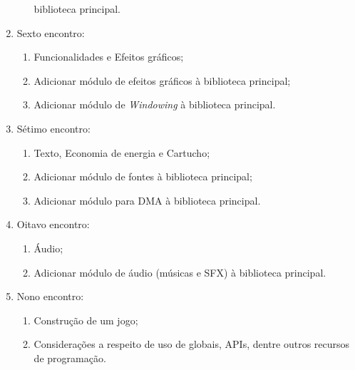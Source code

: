 \documentclass{article}
\begin{document}
\begin{enumerate}[label= (\alph*)]
\begin{enumerate}
                biblioteca principal.
        \end{enumerate}
    \item Sexto encontro:
        \begin{enumerate}
            \item Funcionalidades e Efeitos gráficos;
            \item Adicionar módulo de efeitos gráficos à biblioteca principal;
            \item Adicionar módulo de \textit{Windowing} à biblioteca principal.
        \end{enumerate}
    \item Sétimo encontro:
        \begin{enumerate}
            \item Texto, Economia de energia e Cartucho;
            \item Adicionar módulo de fontes à biblioteca principal;
            \item Adicionar módulo para DMA à biblioteca principal.
        \end{enumerate}
    \item Oitavo encontro:
        \begin{enumerate}
            \item Áudio;
            \item Adicionar módulo de áudio (músicas e SFX) à biblioteca
                principal.
        \end{enumerate}
    \item Nono encontro:
        \begin{enumerate}
            \item Construção de um jogo;
            \item Considerações a respeito de uso de globais, APIs, dentre
                outros recursos de programação.
        \end{enumerate}
\end{enumerate}

\nocite{*}


\end{document}
